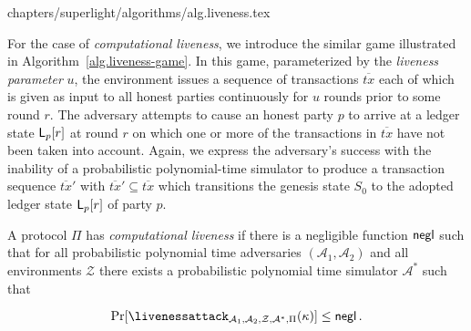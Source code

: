 {chapters/superlight/algorithms/alg.liveness.tex}

For the case of \emph{computational liveness}, we introduce the similar game
illustrated in Algorithm~\ref{alg.liveness-game}. In this game, parameterized by
the \emph{liveness parameter} $u$, the environment issues a sequence of
transactions $\overline{tx}$ each of which is given as input to all honest
parties continuously for $u$ rounds prior to some round $r$. The adversary
attempts to cause an honest party $p$ to arrive at a ledger state $\mathsf{L}_p[r]$
at round $r$ on which one or more of the transactions in $\overline{tx}$ have
not been taken into account. Again, we express the adversary's success with the
inability of a probabilistic polynomial-time simulator to produce a transaction
sequence $\overline{tx}'$ with $\overline{tx}' \subseteq \overline{tx}$ which
transitions the genesis state $S_0$ to the adopted ledger state $\mathsf{L}_p[r]$
of party $p$.

\begin{definition}
  A protocol $\Pi$ has \emph{computational liveness} if there is a negligible
  function $\mathsf{negl}$ such that for all probabilistic
  polynomial time adversaries $(\mathcal{A}_1, \mathcal{A}_2)$ and all environments $\mathcal{Z}$
  there exists a probabilistic
  polynomial time simulator $\mathcal{A}^*$ such that

  \[
  \Pr[\livenessattack_{\mathcal{A}_1,\mathcal{A}_2,\mathcal{Z},\mathcal{A}^*,\Pi}(\kappa)]
  \leq \negl
  \,.
  \]
\end{definition}
